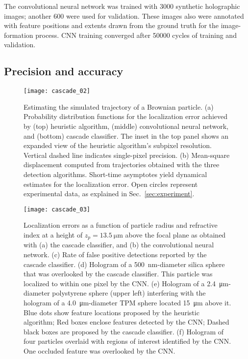 The convolutional neural network was trained with 
\num{3000} synthetic holographic images; another \num{600} 
were used for validation.
These images also were annotated with feature positions and extents
drawn from the ground truth for the image-formation process.
CNN training converged after \num{50000} cycles
of training and validation.

\subsection{Precision and accuracy}
  
\begin{figure}[!t]
  \centering
  \texttt{[image: cascade\_02]} %
  \caption{Estimating the simulated trajectory of a Brownian particle.
  (a) Probability distribution functions for the
  localization error achieved by (top) heuristic
  algorithm, (middle) convolutional neural network,
  and (bottom) cascade classifier. 
  The inset in the top panel shows an expanded view of the heuristic algorithm's subpixel
  resolution. Vertical dashed line indicates single-pixel
  precision.
  (b) Mean-square displacement computed from 
  trajectories obtained with the three detection algorithms.
  Short-time asymptotes yield dynamical estimates
  for the localization error.
  Open circles represent experimental data,
  as explained in Sec.~\ref{sec:experiment}\cite{hannel18}.
  }
  \label{fig:msdplot}
\end{figure}

\begin{figure}
  \centering
  \texttt{[image: cascade\_03]}
  \caption{Localization errors as a function of particle
  radius and refractive index at a height of $z_p = \SI{13.5}{\um}$
  above the focal plane as obtained with (a) the cascade classifier,
  and (b) the convolutional neural network.
  (c) Rate of false positive detections reported by the 
  cascade classifier. (d) Hologram of a \SI{500}{\nm}-diameter silica sphere that was
  overlooked by the cascade classifier.  This particle was localized
  to within one pixel by the CNN.
  (e) Hologram of a \SI{2.4}{\um}-diameter
  polystyrene sphere (upper left) interfering with the hologram of
  a \SI{4.0}{\um}-diameter TPM sphere located \SI{15}{\um} above it.
  Blue dots show feature locations proposed by the heuristic
  algorithm; Red boxes enclose features detected by the CNN; 
  Dashed black boxes are proposed by the cascade classifier.
  (f) Hologram of four particles
  overlaid with regions of interest identified by the CNN.  One
  occluded feature was overlooked by the CNN\cite{hannel18}.
  }
  \label{fig:figure3}
\end{figure}

